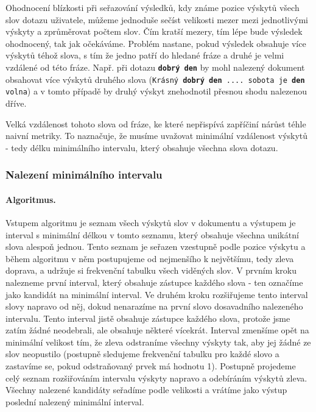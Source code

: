 \documentclass[11pt,letterpaper,oneside,openright]{book}
\newcommand{\bftt}[1]{\texttt{\textbf{#1}}}
\begin{document}
Ohodnocení blízkosti při seřazování výsledků, kdy známe pozice výskytů všech
slov dotazu uživatele, můžeme jednoduše sečíst velikosti mezer mezi
jednotlivými výskyty a zprůměrovat počtem slov. Čím kratší mezery, tím lépe
bude výsledek ohodnocený, tak jak očekáváme. Problém nastane, pokud výsledek
obsahuje více výskytů téhož slova, s tím že jedno patří do hledané fráze a
druhé je velmi vzdálené od této fráze. Např. při dotazu \bftt{dobrý den} by
mohl nalezený dokument obsahovat více výskytů druhého slova (\texttt{Krásný
\bftt{dobrý den} .... sobota je \bftt{den} volna}) a v tomto případě by druhý
výskyt znehodnotil přesnou shodu nalezenou dříve.

Velká vzdálenost tohoto slova od fráze, ke které nepřispívá zapříčiní nárůst
téhle naivní metriky. To naznačuje, že musíme uvažovat minimální vzdálenost
výskytů - tedy délku minimálního intervalu, který obsahuje všechna slova
dotazu.

\subsubsection{Nalezení minimálního intervalu} \label{sec:find_minimal_interval}
\paragraph{Algoritmus.} Vstupem algoritmu je seznam všech výskytů slov v
dokumentu a výstupem je interval s minimální délkou v tomto seznamu, který
obsahuje všechna unikátní slova alespoň jednou. Tento seznam je seřazen
vzestupně podle pozice výskytu a během algoritmu v něm postupujeme od
nejmenšího k největšímu, tedy zleva doprava, a udržuje si frekvenční tabulku
všech viděných slov.  V prvním kroku nalezneme první interval, který obsahuje
zástupce každého slova - ten označíme jako kandidát na minimální interval. Ve
druhém kroku rozšiřujeme tento interval slovy napravo od něj, dokud nenarazíme
na první slovo dosavadního nalezeného intervalu. Tento interval jistě obsahuje
zástupce každého slova, protože jsme zatím žádné neodebrali, ale obsahuje
některé vícekrát. Interval zmenšíme opět na minimální velikost tím, že zleva
odstraníme všechny výskyty tak, aby jej žádné ze slov neopustilo (postupně
sledujeme frekvenční tabulku pro každé slovo a zastavíme se, pokud odstraňovaný
prvek má hodnotu 1). Postupně projedeme celý seznam rozšiřováním intervalu
výskyty napravo a odebíráním výskytů zleva. Všechny nalezené kandidáty seřadíme
podle velikosti a vrátíme jako výstup poslední nalezený minimální interval.
\end{document}

